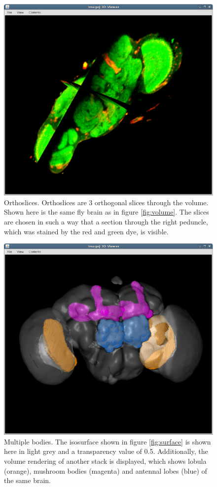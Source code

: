 \documentclass[a4paper,10pt]{article}
\begin{document}
\begin{figure}[m]
\includegraphics[width=\textwidth]{images/orthoslices.eps}
\caption{Orthoslices. Orthoslices are 3 orthogonal slices through the volume. Shown here is the same fly brain as in figure \ref{fig:volume}. The slices are chosen in such a way that a section through the right peduncle, which was stained by the red and green dye, is visible.}
\label{fig:orthoslices}
\end{figure}

\begin{figure}[m]
\includegraphics[width=\textwidth]{images/multiple.eps}
\caption{Multiple bodies. The isosurface shown in figure \ref{fig:surface} is shown here in light grey and a transparency value of 0.5. Additionally, the volume rendering of another stack is displayed, which shows lobula (orange), mushroom bodies (magenta) and antennal lobes (blue) of the same brain.}
\label{fig:multiple}
\end{figure}
\end{document}
